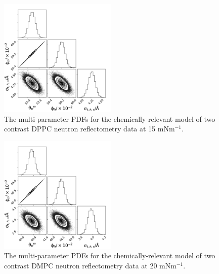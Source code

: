 \documentclass[11pt,a4paper]{paper}
\begin{document}
\begin{figure}[H]
	\centering
	\includegraphics[width=0.50\textwidth]{figures/dppc_15n_all_corner}
	\caption{The multi-parameter PDFs for the chemically-relevant model of two contrast DPPC neutron reflectometry data at 15 mNm$^{-1}$.}
	\label{fig:dppcn1}
\end{figure}
\begin{figure}[H]
	\centering
	\includegraphics[width=0.50\textwidth]{figures/dppc_20n_all_corner}
	\caption{The multi-parameter PDFs for the chemically-relevant model of two contrast DMPC neutron reflectometry data at 20 mNm$^{-1}$.}
	\label{fig:dppcn2}
\end{figure}

\end{document}
